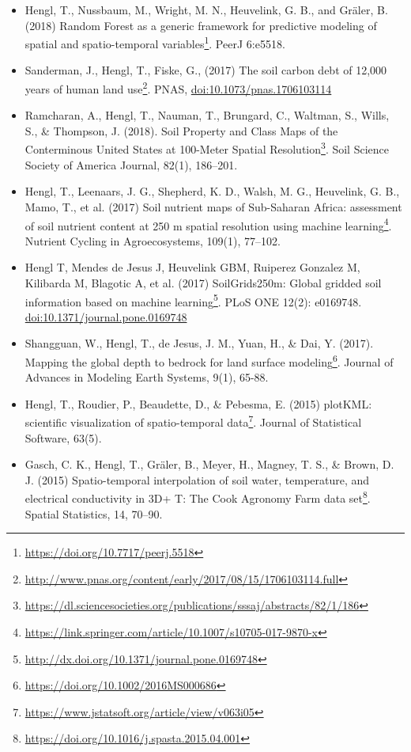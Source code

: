 \documentclass[graybox,natbib,nospthms,UStrade]{svmono}
\renewcommand{\href}[2]{#2 (\url{#1})}
\renewcommand{\href}[2]{#2\footnote{\url{#1}}}
\begin{document}
\begin{itemize}
\item
  Hengl, T., Nussbaum, M., Wright, M. N., Heuvelink, G. B., and Gräler, B. (2018) \href{https://doi.org/10.7717/peerj.5518}{Random Forest as a generic framework for predictive modeling of spatial and spatio-temporal variables}. PeerJ 6:e5518.
\item
  Sanderman, J., Hengl, T., Fiske, G., (2017) \href{http://www.pnas.org/content/early/2017/08/15/1706103114.full}{The soil carbon debt of 12,000 years of human land use}. PNAS, \url{doi:10.1073/pnas.1706103114}
\item
  Ramcharan, A., Hengl, T., Nauman, T., Brungard, C., Waltman, S., Wills, S., \& Thompson, J. (2018). \href{https://dl.sciencesocieties.org/publications/sssaj/abstracts/82/1/186}{Soil Property and Class Maps of the Conterminous United States at 100-Meter Spatial Resolution}. Soil Science Society of America Journal, 82(1), 186--201.
\item
  Hengl, T., Leenaars, J. G., Shepherd, K. D., Walsh, M. G., Heuvelink, G. B., Mamo, T., et al. (2017) \href{https://link.springer.com/article/10.1007/s10705-017-9870-x}{Soil nutrient maps of Sub-Saharan Africa: assessment of soil nutrient content at 250 m spatial resolution using machine learning}. Nutrient Cycling in Agroecosystems, 109(1), 77--102.
\item
  Hengl T, Mendes de Jesus J, Heuvelink GBM, Ruiperez Gonzalez M, Kilibarda M, Blagotic A, et al. (2017) \href{http://dx.doi.org/10.1371/journal.pone.0169748}{SoilGrids250m: Global gridded soil information based on machine learning}. PLoS ONE 12(2): e0169748. \url{doi:10.1371/journal.pone.0169748}
\item
  Shangguan, W., Hengl, T., de Jesus, J. M., Yuan, H., \& Dai, Y. (2017). \href{https://doi.org/10.1002/2016MS000686}{Mapping the global depth to bedrock for land surface modeling}. Journal of Advances in Modeling Earth Systems, 9(1), 65-88.
\item
  Hengl, T., Roudier, P., Beaudette, D., \& Pebesma, E. (2015) \href{https://www.jstatsoft.org/article/view/v063i05}{plotKML: scientific visualization of spatio-temporal data}. Journal of Statistical Software, 63(5).
\item
  Gasch, C. K., Hengl, T., Gräler, B., Meyer, H., Magney, T. S., \& Brown, D. J. (2015) \href{https://doi.org/10.1016/j.spasta.2015.04.001}{Spatio-temporal interpolation of soil water, temperature, and electrical conductivity in 3D+ T: The Cook Agronomy Farm data set}. Spatial Statistics, 14, 70--90.

\end{itemize}
\end{document}
